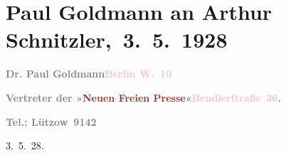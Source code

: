 

\renewcommand{\erwaehntePersonen}{Personen: Paul Goldmann, Eva Marie Goldmann, Franziska Goldmann}
\renewcommand{\erwaehnteInstitutionen}{Institutionen: Neue Freie Presse, S. Fischer Verlag}
\renewcommand{\erwaehnteOrte}{Orte: Bendlerstraße, Berlin, Wien}
\renewcommand{\erwaehnteWerke}{Werke: Therese. Chronik eines Frauenlebens}
\section[ Paul Goldmann an Arthur Schnitzler, 3. 5. 1928]{Paul Goldmann an Arthur Schnitzler, 3. 5. 1928}
\nopagebreak{}
\rehead{ }\normalsize\beginnumbering{}
\toendnotes[C]{\smallbreak\pagebreak[2]}
\toendnotes[C]{\smallbreak}
\pstart
           \noindent{}{\pb}\textcolor{gray}{\textbf{Dr. Paul Goldmann}}\hfill \textcolor{gray}{\textbf{\textcolor{pink}{Berlin W. 10}{}\ledrightnote{\textcolor{pink}{Berlin}}}}\pend
           
\pstart
           \textcolor{gray}{\textbf{Vertreter der »\textcolor{brown}{Neuen Freien
                           Presse}{}\ledrightnote{\textcolor{brown}{Neue Freie Presse}}«}}\hfill \textcolor{gray}{\textbf{\textcolor{pink}{Bendlerſtraße 36}{}\ledrightnote{\textcolor{pink}{Bendlerstraße}}.}}\pend
           
\pstart
           \raggedleft{}\textcolor{gray}{\textbf{Tel.: Lützow 9142}}\pend
           
\pstart
           \raggedleft{}3. 5. 28.\pend
           

